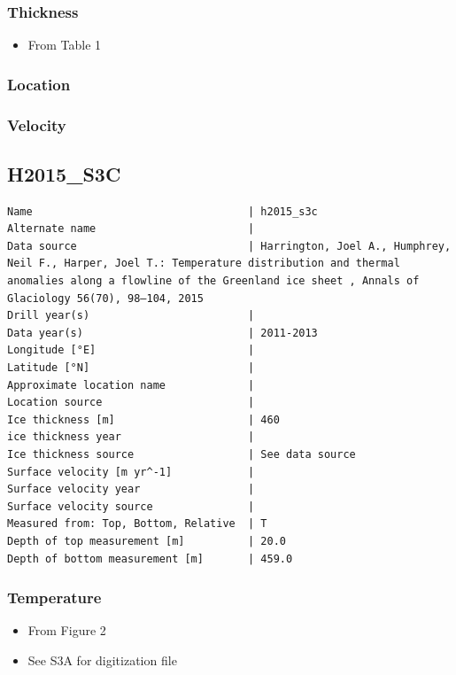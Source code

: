 \documentclass[article,a4paper,times,11pt,twoside]{article}
\begin{document}
\subsubsection{Thickness}
\label{sec:org0395a50}

\begin{itemize}
\item From \textcite{harrington_2015} Table 1
\end{itemize}

\subsubsection{Location}
\label{sec:org8f58c70}

\subsubsection{Velocity}
\label{sec:orge3a4d27}
\clearpage
\subsection{H2015\_S3C}
\label{sec:org9a4fbae}
\begin{verbatim}
Name                                  | h2015_s3c
Alternate name                        | 
Data source                           | Harrington, Joel A., Humphrey, Neil F., Harper, Joel T.: Temperature distribution and thermal anomalies along a flowline of the Greenland ice sheet , Annals of Glaciology 56(70), 98–104, 2015 
Drill year(s)                         | 
Data year(s)                          | 2011-2013
Longitude [°E]                        | 
Latitude [°N]                         | 
Approximate location name             | 
Location source                       | 
Ice thickness [m]                     | 460
ice thickness year                    | 
Ice thickness source                  | See data source
Surface velocity [m yr^-1]            | 
Surface velocity year                 | 
Surface velocity source               | 
Measured from: Top, Bottom, Relative  | T
Depth of top measurement [m]          | 20.0
Depth of bottom measurement [m]       | 459.0
\end{verbatim}

\subsubsection{Temperature}
\label{sec:orgce328d0}

\begin{itemize}
\item From \textcite{harrington_2015} Figure 2
\item See S3A for digitization file
\end{itemize}
\end{document}
